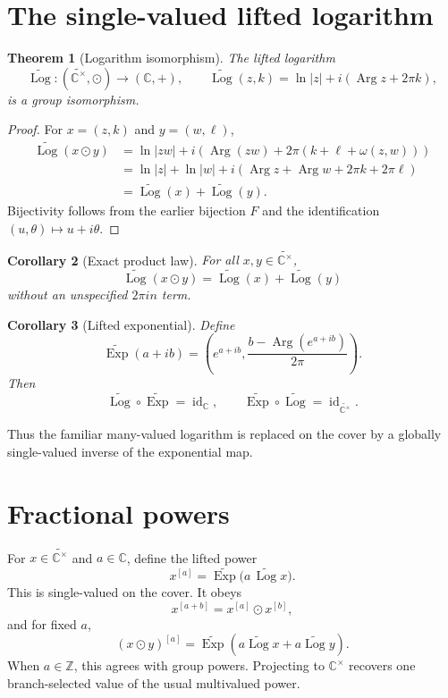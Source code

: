 \documentclass[11pt]{article}
\newtheorem{theorem}{Theorem}[section]
\newtheorem{corollary}[theorem]{Corollary}
\newcommand{\C}{\mathbb C}
\newcommand{\Z}{\mathbb Z}
\newcommand{\Argp}{\operatorname{Arg}}
\newcommand{\wtC}{\widetilde{\C^{\times}}}
\begin{document}
\section{The single-valued lifted logarithm}

\begin{theorem}[Logarithm isomorphism]
The lifted logarithm
\[
\widetilde{\operatorname{Log}}: (\wtC,\odot)\longrightarrow(\C,+),
\qquad
\widetilde{\operatorname{Log}}(z,k)=\ln|z|+i(\Argp z+2\pi k),
\]
is a group isomorphism.
\end{theorem}

\begin{proof}
For $x=(z,k)$ and $y=(w,\ell)$,
\begin{align*}
\widetilde{\operatorname{Log}}(x\odot y)
&=\ln|zw|+i\left(\Argp(zw)+2\pi(k+\ell+\omega(z,w))\right)\\
&=\ln|z|+\ln|w|
+i\left(\Argp z+\Argp w+2\pi k+2\pi\ell\right)\\
&=\widetilde{\operatorname{Log}}(x)+\widetilde{\operatorname{Log}}(y).
\end{align*}
Bijectivity follows from the earlier bijection $F$ and the identification $(u,\theta)\mapsto u+i\theta$.
\end{proof}

\begin{corollary}[Exact product law]
For all $x,y\in\wtC$,
\[
\widetilde{\operatorname{Log}}(x\odot y)
=
\widetilde{\operatorname{Log}}(x)+\widetilde{\operatorname{Log}}(y)
\]
without an unspecified $2\pi i n$ term.
\end{corollary}

\begin{corollary}[Lifted exponential]
Define
\[
\widetilde{\operatorname{Exp}}(a+ib)
=
\left(e^{a+ib},\frac{b-\Argp(e^{a+ib})}{2\pi}\right).
\]
Then
\[
\widetilde{\operatorname{Log}}\circ\widetilde{\operatorname{Exp}}=\operatorname{id}_{\C},
\qquad
\widetilde{\operatorname{Exp}}\circ\widetilde{\operatorname{Log}}=\operatorname{id}_{\wtC}.
\]
\end{corollary}

Thus the familiar many-valued logarithm is replaced on the cover by a globally single-valued inverse of the exponential map.

\section{Fractional powers}
For $x\in\wtC$ and $a\in\C$, define the lifted power
\[
x^{[a]}=\widetilde{\operatorname{Exp}}\bigl(a\,\widetilde{\operatorname{Log}}x\bigr).
\]
This is single-valued on the cover.  It obeys
\[
x^{[a+b]}=x^{[a]}\odot x^{[b]},
\]
and for fixed $a$,
\[
(x\odot y)^{[a]}
=
\widetilde{\operatorname{Exp}}\left(a\widetilde{\operatorname{Log}}x+a\widetilde{\operatorname{Log}}y\right).
\]
When $a\in\Z$, this agrees with group powers.  Projecting to $\C^{\times}$ recovers one branch-selected value of the usual multivalued power.
\end{document}
